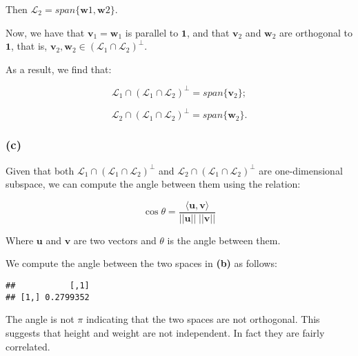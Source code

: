 \documentclass[]{article}
\newenvironment{Shaded}{\begin{snugshade}}{\end{snugshade}}
\newcommand{\KeywordTok}[1]{\textcolor[rgb]{0.13,0.29,0.53}{\textbf{#1}}}
\newcommand{\StringTok}[1]{\textcolor[rgb]{0.31,0.60,0.02}{#1}}
\newcommand{\OperatorTok}[1]{\textcolor[rgb]{0.81,0.36,0.00}{\textbf{#1}}}
\newcommand{\NormalTok}[1]{#1}
\begin{document}
Then \(\mathcal{L}_2 = span \{\mathbf{w}1, \mathbf{w}2\}\).

Now, we have that \(\mathbf{v}_1 = \mathbf{w}_1\) is parallel to
\(\mathbf{1}\), and that \(\mathbf{v}_2\) and \(\mathbf{w}_2\) are
orthogonal to \(\mathbf{1}\), that is,
\(\mathbf{v}_2, \mathbf{w}_2 \in ({\mathcal{L}_1 \cap \mathcal{L}_2})^{\perp}\).

As a result, we find that:

\[ \mathcal{L}_1 \cap ({\mathcal{L}_1 \cap \mathcal{L}_2})^{\perp} = span \{ \mathbf{v}_2 \}; \]

\[ \mathcal{L}_2 \cap ({\mathcal{L}_1 \cap \mathcal{L}_2})^{\perp} = span \{ \mathbf{w}_2 \}. \]

\subsubsection{(c)}\label{c}

Given that both
\(\mathcal{L}_1 \cap ({\mathcal{L}_1 \cap \mathcal{L}_2})^{\perp}\) and
\(\mathcal{L}_2 \cap ({\mathcal{L}_1 \cap \mathcal{L}_2})^{\perp}\) are
one-dimensional subspace, we can compute the angle between them using
the relation:

\[
\cos \theta = \frac{ \langle \mathbf{u}, \mathbf{v} \rangle }{||\mathbf{u}|| \; ||\mathbf{v}||}
\]

Where \(\mathbf{u}\) and \(\mathbf{v}\) are two vectors and \(\theta\)
is the angle between them.

We compute the angle between the two spaces in \textbf{(b)} as follows:

\begin{Shaded}
\end{Shaded}

\begin{verbatim}
##           [,1]
## [1,] 0.2799352
\end{verbatim}

The angle is not \(\pi\) indicating that the two spaces are not
orthogonal. This suggests that height and weight are not independent. In
fact they are fairly correlated.
\end{document}
